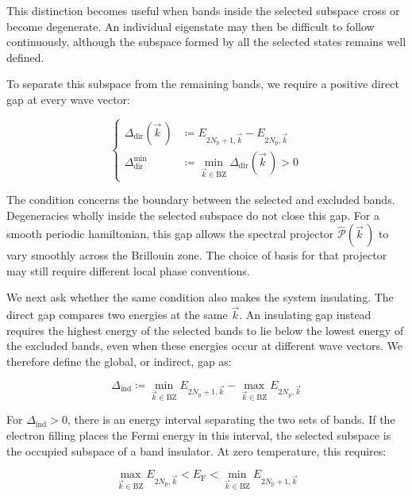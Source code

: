 This distinction becomes useful when bands inside the selected subspace cross or become degenerate.
An individual eigenstate may then be difficult to follow continuously,
although the subspace formed by all the selected states remains well defined.

To separate this subspace from the remaining bands,
we require a positive direct gap at every wave vector:

\begin{equation}
\left\{\begin{aligned}
    \Delta_\mathrm{dir}(\vec{k}\,)
    &\coloneqq E_{2N_\mathrm{p}+1,\vec{k}}-E_{2N_\mathrm{p},\vec{k}} \\
    \Delta_\mathrm{dir}^\mathrm{min}
    &\coloneqq\min_{\vec{k}\in\mathrm{BZ}}\Delta_\mathrm{dir}(\vec{k}\,)>0
\end{aligned}\right.
\label{minimum_direct_gap_topology}
\end{equation}

The condition concerns the boundary between the selected and excluded bands.
Degeneracies wholly inside the selected subspace do not close this gap.
For a smooth periodic hamiltonian, this gap allows the spectral projector
$\hat{\mathcal{P}}(\vec{k}\,)$ to vary smoothly across the Brillouin zone.
The choice of basis for that projector may still require different local phase conventions.

We next ask whether the same condition also makes the system insulating.
The direct gap compares two energies at the same $\vec{k}$.
An insulating gap instead requires the highest energy of the selected bands to lie below the lowest energy of the excluded bands,
even when these energies occur at different wave vectors.
We therefore define the global, or indirect, gap as:

\begin{equation}
    \Delta_\mathrm{ind}
    \coloneqq\min_{\vec{k}\in\mathrm{BZ}}E_{2N_\mathrm{p}+1,\vec{k}}
    -\max_{\vec{k}\in\mathrm{BZ}}E_{2N_\mathrm{p},\vec{k}}
\label{indirect_gap_topology}
\end{equation}

For $\Delta_\mathrm{ind}>0$, there is an energy interval separating the two sets of bands.
If the electron filling places the Fermi energy in this interval,
the selected subspace is the occupied subspace of a band insulator.
At zero temperature, this requires:

\begin{equation}
    \max_{\vec{k}\in\mathrm{BZ}}E_{2N_\mathrm{p},\vec{k}}
    <E_\mathrm{F}
    <\min_{\vec{k}\in\mathrm{BZ}}E_{2N_\mathrm{p}+1,\vec{k}}
\label{insulating_fermi_level_topology}
\end{equation}


